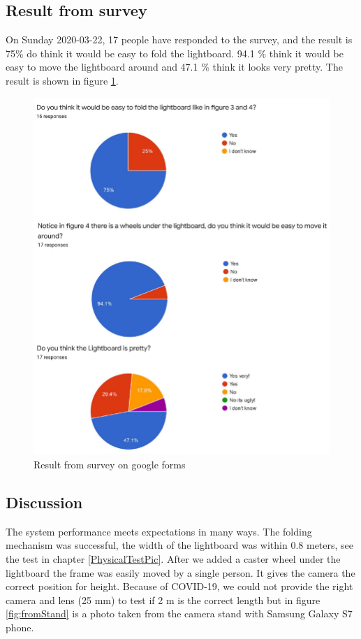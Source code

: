 \documentclass[a4paper]{jpconf}
\begin{document}
\subsection{Result from survey}
On Sunday 2020-03-22, 17 people have responded to the survey, and the result is 75\% do think it would be easy to fold the lightboard.
94.1 \% think it would be easy to move the lightboard around and 47.1 \% think it looks very pretty. The result is shown in figure \ref{fig:SurResult}.
\begin{figure}
	\centering
	\includegraphics[width=1\linewidth]{surveyres2.pdf}
	\caption{Result from survey on google forms}
	\label{fig:SurResult}
\end{figure}

\subsection{Discussion}
The system performance meets expectations in many ways.
The folding mechanism was successful, the width of the lightboard was within 0.8 meters, see the test in chapter \ref{PhysicalTestPic}.
After we added a caster wheel under the lightboard the frame was easily moved by a single person.
It gives the camera the correct position for height.
Because of COVID-19, we could not provide the right camera and lens (25 mm) to test if 2 m is the correct length but in figure \ref{fig:fromStand} is a photo taken from the camera stand with Samsung Galaxy S7 phone.
\end{document}
